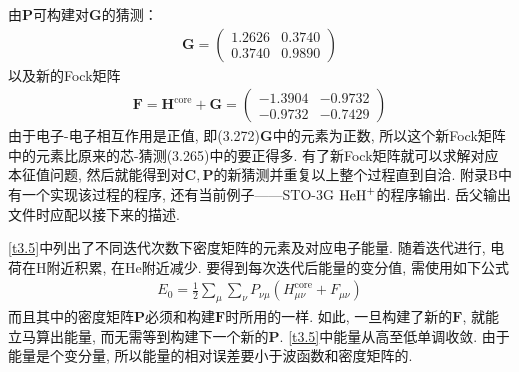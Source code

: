 由$\mathbf{P}$可构建对$\mathbf{G}$的猜测：
\begin{align}
\mathbf{G}=\begin{pmatrix}
1.2626&0.3740\\0.3740&0.9890
\end{pmatrix}
\end{align}
以及新的Fock矩阵
\begin{align}
\mathbf{F=H}^\mathrm{core}+\mathbf{G}=
\begin{pmatrix}
-1.3904&-0.9732 \\ -0.9732&-0.7429
\end{pmatrix}
\end{align}
由于电子-电子相互作用是正值, 即(3.272)$\mathbf{G}$中的元素为正数, 所以这个新Fock矩阵中的元素比原来的芯-\ha 猜测(3.265)中的要正得多. 有了新Fock矩阵就可以求解对应本征值问题, 然后就能得到对$\mathbf{C,P}$的新猜测并重复以上整个过程直到自洽. 附录B中有一个实现该过程的程序, 还有当前例子——STO-3G $\mathrm{HeH}^+$的程序输出. 岳父输出文件时应配以接下来的描述.

\ref{t3.5}中列出了不同迭代次数下密度矩阵的元素及对应电子能量. 随着迭代进行, 电荷在$\mathrm{H}$附近积累, 在$\mathrm{He}$附近减少. 要得到每次迭代后能量的变分值, 需使用如下公式
\begin{align}
E_0 = \frac{1}{2}\sum_\mu\sum_\nu P_{\nu\mu}(H_{\mu\nu}^\mathrm{core}+F_{\mu\nu})
\end{align}
而且其中的密度矩阵$\mathbf{P}$必须和构建$\mathbf{F}$时所用的一样. 如此, 一旦构建了新的$\mathbf{F}$, 就能立马算出能量, 而无需等到构建下一个新的$\mathbf{P}$. 
\ref{t3.5}中能量从高至低单调收敛. 由于能量是个变分量, 所以能量的相对误差要小于波函数和密度矩阵的. 

